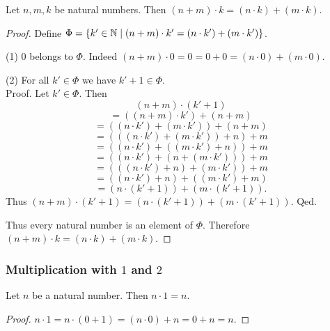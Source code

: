 \documentclass[10pt]{article}
\begin{document}
  \begin{forthel}
    \begin{proposition}[id=ARITHMETIC_06_5742967566368768,printid]
      Let $n, m, k$ be natural numbers.
      Then $(n + m) \cdot k = (n \cdot k) + (m \cdot k)$.
    \end{proposition}
    \begin{proof}
      Define $\Phi = \{ k' \in \mathbb{N} \mid (n + m) \cdot k' = (n \cdot k') + (m \cdot k') \}$.

      (1) $0$ belongs to $\Phi$.
      Indeed $(n + m) \cdot 0
        = 0
        = 0 + 0
        = (n \cdot 0) + (m \cdot 0)$.

      (2) For all $k' \in \Phi$ we have $k' + 1 \in \Phi$. \\
      Proof.
        Let $k' \in \Phi$.
        Then
        \[  (n + m) \cdot (k' + 1)                        \]
        \[    = ((n + m) \cdot k') + (n + m)              \]
        \[    = ((n \cdot k') + (m \cdot k')) + (n + m)   \]
        \[    = (((n \cdot k') + (m \cdot k')) + n) + m   \]
        \[    = ((n \cdot k') + ((m \cdot k') + n)) + m   \]
        \[    = ((n \cdot k') + (n + (m \cdot k'))) + m   \]
        \[    = (((n \cdot k') + n) + (m \cdot k')) + m   \]
        \[    = ((n \cdot k') + n) + ((m \cdot k') + m)   \]
        \[    = (n \cdot (k' + 1)) + (m \cdot (k' + 1)).  \]
        Thus $(n + m) \cdot (k' + 1) = (n \cdot (k' + 1)) + (m \cdot (k' + 1))$.
      Qed.

      Thus every natural number is an element of $\Phi$.
      Therefore $(n + m) \cdot k = (n \cdot k) + (m \cdot k)$.
    \end{proof}
  \end{forthel}


  \subsubsection*{Multiplication with $1$ and $2$}

  \begin{forthel}
    \begin{proposition}[id=ARITHMETIC_06_2910559821365248,printid]
      Let $n$ be a natural number.
      Then $n \cdot 1 = n$.
    \end{proposition}
    \begin{proof}
      $n \cdot 1
        = n \cdot (0 + 1)
        = (n \cdot 0) + n
        = 0 + n
        = n$.
    \end{proof}
  \end{forthel}
\end{document}
